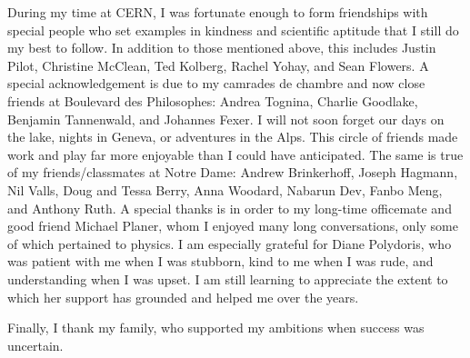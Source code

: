 \documentclass[final,numrefs,sort&compress,noinfo]{nddiss2e}
\begin{document}
\begin{acknowledge}
During my time at CERN, I was fortunate enough to form friendships with special people who set examples
in kindness and scientific aptitude that I still do my best to follow. 
In addition to those mentioned above, this includes Justin Pilot, Christine McClean, Ted Kolberg,
Rachel Yohay, and Sean Flowers.
A special acknowledgement is due to my camrades de chambre and now close friends at Boulevard des Philosophes:
Andrea Tognina, Charlie Goodlake, Benjamin Tannenwald, and Johannes Fexer.
I will not soon forget our days on the lake, nights in Geneva, or adventures in the Alps.  
This circle of friends made work and play far more enjoyable
than I could have anticipated.
The same is true of my friends/classmates at Notre Dame:
Andrew Brinkerhoff, Joseph Hagmann, Nil Valls, Doug and Tessa Berry,
Anna Woodard, Nabarun Dev, Fanbo Meng, and Anthony Ruth. A special thanks is in order to my long-time officemate and
good friend Michael Planer, whom I enjoyed many long conversations, only some of which pertained to physics. 
I am especially grateful for Diane Polydoris, who was patient with me when I was stubborn, kind to me when I was rude,
and understanding when I was upset. I am still learning to appreciate the extent to which her support has grounded and helped me
over the years.

Finally, I thank my family, who supported my ambitions when success was uncertain.

\end{acknowledge}

\mainmatter













\appendix


\backmatter              %

\end{document}
